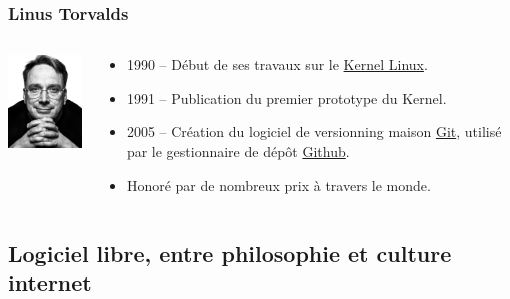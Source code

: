 \documentclass{beamer}
\begin{document}
\begin{frame}
	\frametitle{Linus Torvalds}
	
\begin{columns}
	\begin{column}{.3\linewidth}
		\href{https://fr.wikipedia.org/wiki/Linus_Torvalds}{\includegraphics[width=3cm]{static/img/linus_torvalds.jpg}}
	\end{column}

	\begin{column}{.7\linewidth}
		\begin{itemize}
			\item 1990 -- Début de ses travaux sur le \href{https://github.com/torvalds/linux}{Kernel Linux}.
			\item 1991 -- Publication du premier prototype du Kernel.
			\item 2005 -- Création du logiciel de versionning maison \href{https://git-scm.com/}{Git}, utilisé par le gestionnaire de dépôt \href{https://github.com/}{Github}.
			\item Honoré par de nombreux prix à travers le monde.
		\end{itemize}
	\end{column}
\end{columns}
	
\end{frame}

\subsection{Logiciel libre, entre philosophie et culture internet}
\begin{frame}
	\frametitle{\insertsubsection}
\end{frame}
\end{document}
